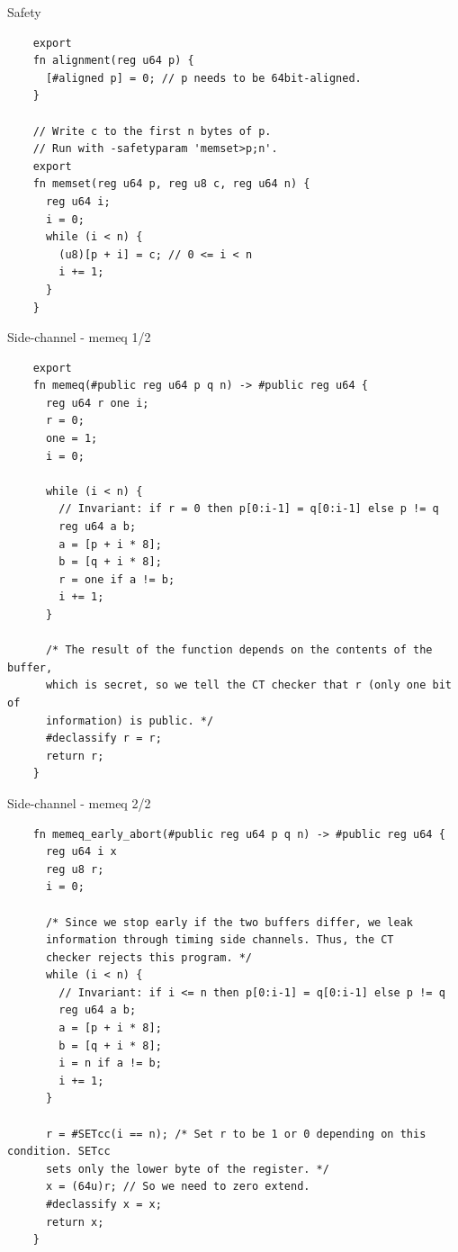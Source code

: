 \begin{frame}[fragile]{Safety}
  \lstset{
    language=Jasmin,
    basicstyle=\footnotesize\ttfamily,
    escapechar=~~,
  }
  \begin{lstlisting}
    export
    fn alignment(reg u64 p) {
      [#aligned p] = 0; // p needs to be 64bit-aligned.
    }

    // Write c to the first n bytes of p.
    // Run with -safetyparam 'memset>p;n'.
    export
    fn memset(reg u64 p, reg u8 c, reg u64 n) {
      reg u64 i;
      i = 0;
      while (i < n) {
        (u8)[p + i] = c; // 0 <= i < n
        i += 1;
      }
    }
  \end{lstlisting}
\end{frame}

\begin{frame}[fragile]{Side-channel - memeq 1/2}
  \lstset{
    language=Jasmin,
    basicstyle=\scriptsize\ttfamily,
    escapechar=~~,
  }
  \begin{lstlisting}
    export
    fn memeq(#public reg u64 p q n) -> #public reg u64 {
      reg u64 r one i;
      r = 0;
      one = 1;
      i = 0;

      while (i < n) {
        // Invariant: if r = 0 then p[0:i-1] = q[0:i-1] else p != q
        reg u64 a b;
        a = [p + i * 8];
        b = [q + i * 8];
        r = one if a != b;
        i += 1;
      }

      /* The result of the function depends on the contents of the buffer,
      which is secret, so we tell the CT checker that r (only one bit of
      information) is public. */
      #declassify r = r;
      return r;
    }
  \end{lstlisting}
\end{frame}

\begin{frame}[fragile]{Side-channel - memeq 2/2}
  \lstset{
    language=Jasmin,
    basicstyle=\scriptsize\ttfamily,
    escapechar=~~,
  }
  \begin{lstlisting}
    fn memeq_early_abort(#public reg u64 p q n) -> #public reg u64 {
      reg u64 i x
      reg u8 r;
      i = 0;

      /* Since we stop early if the two buffers differ, we leak
      information through timing side channels. Thus, the CT
      checker rejects this program. */
      while (i < n) {
        // Invariant: if i <= n then p[0:i-1] = q[0:i-1] else p != q
        reg u64 a b;
        a = [p + i * 8];
        b = [q + i * 8];
        i = n if a != b;
        i += 1;
      }

      r = #SETcc(i == n); /* Set r to be 1 or 0 depending on this condition. SETcc
      sets only the lower byte of the register. */
      x = (64u)r; // So we need to zero extend.
      #declassify x = x;
      return x;
    }
  \end{lstlisting}
\end{frame}


